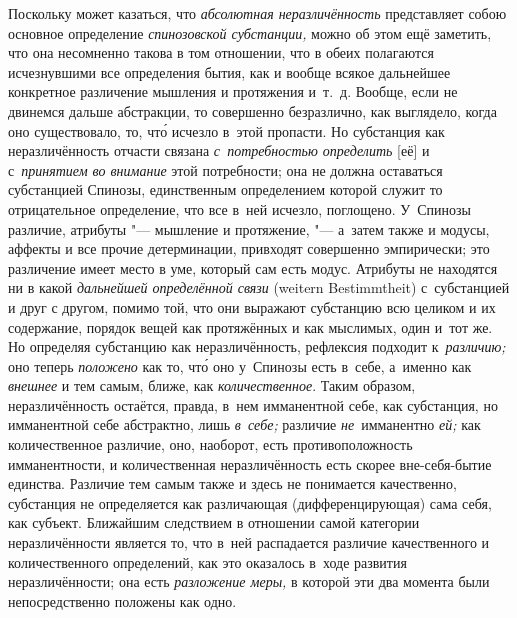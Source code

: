 Поскольку может казаться, что {\em абсолютная неразличённость} представляет
собою основное определение {\em спинозовской субстанции,} можно об этом ещё
заметить, что она несомненно такова в том отношении, что в обеих полагаются
исчезнувшими все определения бытия, как и вообще всякое дальнейшее конкретное
различение мышления и протяжения и~т.~д. Вообще, если не двинемся дальше
абстракции, то совершенно безразлично, как выглядело, когда оно существовало,
то, чт\'{о} исчезло в~этой пропасти. Но субстанция как неразличённость отчасти
связана {\em с~потребностью определить} [её] и с~{\em принятием во внимание}
этой потребности; она не должна оставаться субстанцией Спинозы, единственным
определением которой служит то отрицательное определение, что все в~ней
исчезло, поглощено. У~Спинозы
различие, атрибуты "--- мышление и протяжение, "--- а~затем также и модусы,
аффекты и все прочие детерминации, привходят совершенно эмпирически; это
различение имеет место в уме, который сам есть модус. Атрибуты не находятся ни
в какой {\em дальнейшей определённой связи} (wei\-tern Be\-stimmt\-heit)
с~субстанцией и друг с другом, помимо той, что они выражают субстанцию всю
целиком и их содержание, порядок вещей как протяжённых и как мыслимых, один
и~тот же. Но определяя субстанцию как неразличённость, рефлексия подходит
к~{\em различию;} оно теперь {\em положено} как то, чт\'{о} оно у~Спинозы есть
в~себе, а~именно как {\em внешнее} и тем самым, ближе, как
{\em количественное}. Таким образом, неразличённость остаётся, правда, в~нем
имманентной себе, как субстанция, но имманентной себе абстрактно, лишь
{\em в~себе;} различие {\em не}~имманентно {\em ей;} как количественное
различие, оно, наоборот, есть противоположность имманентности, и количественная
неразличённость есть скорее вне-себя-бытие единства. Различие тем самым также и
здесь не понимается качественно, субстанция не определяется как различающая
(дифференцирующая) сама себя, как субъект. Ближайшим следствием в отношении
самой категории неразличённости является то, что в~ней распадается различие
качественного и количественного определений, как это оказалось в~ходе развития
неразличённости; она есть {\em разложение меры,} в которой эти два момента были
непосредственно положены как одно.

